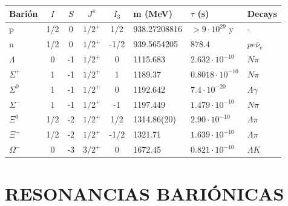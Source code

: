 {
\centering
\begin{tabular}{|l|c|c|c|c|l|l|l|}
\hline
\textbf{Barión} & $I$ & $S$ & $J^\pi$ & $I_3$ & \textbf{m (MeV)} & $\tau$ \textbf{(s)} & \textbf{Decays} \\ \hline
p & 1/2 & 0 & $1/2^+$ & 1/2 & 938.27208816 & $> 9 \cdot 10^{29}$ y & - \\ \hline
n & 1/2 & 0 & $1/2^+$ & -1/2 & 939.5654205 & 878.4 & $p e \bar{\nu}_e$ \\ \hline
$\Lambda$ & 0 & -1 & $1/2^+$ & 0 & 1115.683 & $2.632 \cdot 10^{-10}$ & $N\pi$ \\ \hline
$\Sigma^+$ & 1 & -1 & $1/2^+$ & 1 & 1189.37 & $0.8018 \cdot 10^{-10}$ & $N\pi$ \\ \hline
$\Sigma^0$ & 1 & -1 & $1/2^+$ & 0 & 1192.642 & $7.4 \cdot 10^{-20}$ & $\Lambda\gamma$ \\ \hline
$\Sigma^-$ & 1 & -1 & $1/2^+$ & -1 & 1197.449 & $1.479 \cdot 10^{-10}$ & $N\pi$ \\ \hline
$\Xi^0$ & 1/2 & -2 & $1/2^+$ & 1/2 & 1314.86(20) & $2.90 \cdot 10^{-10}$ & $\Lambda\pi$ \\ \hline
$\Xi^-$ & 1/2 & -2 & $1/2^+$ & -1/2 & 1321.71 & $1.639 \cdot 10^{-10}$ & $\Lambda\pi$ \\ \hline
$\Omega^-$ & 0 & -3 & $3/2^+$ & 0 & 1672.45 & $0.821 \cdot 10^{-10}$ & $\Lambda K$ \\ \hline
\end{tabular}

}

\section{RESONANCIAS BARIÓNICAS}

